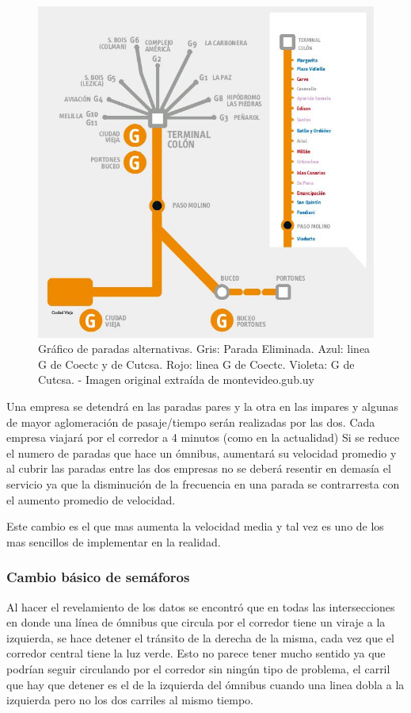 \begin{figure}[H]
	\centering
	\includegraphics[width=0.7\linewidth]{Figures/paradas_alternativas}
	\caption{Gráfico de paradas alternativas. Gris: Parada Eliminada. Azul: linea G de Coectc y de Cutcsa. Rojo: linea G de Coectc. Violeta: G de Cutcsa. - Imagen original extraída de montevideo.gub.uy}
	\label{fig:paradas_alternadas}
\end{figure}

Una empresa se detendrá en las paradas pares y la otra en las impares y algunas de mayor aglomeración de pasaje/tiempo serán realizadas por las dos. Cada empresa viajará por el corredor a 4 minutos (como en la actualidad) Si se reduce el numero de paradas que hace un ómnibus, aumentará su velocidad promedio y al cubrir las paradas entre las dos empresas no se deberá resentir en demasía el servicio ya que la disminución de la frecuencia en una parada se contrarresta con el aumento promedio de velocidad.

Este cambio es el que mas aumenta la velocidad media y tal vez es uno de los mas sencillos de implementar en la realidad.



\subsubsection{Cambio básico de semáforos}
Al hacer el revelamiento de los datos se encontró que en todas las intersecciones en donde una línea de ómnibus que circula por el corredor tiene un viraje a la izquierda, se hace detener el tránsito de la derecha de la misma, cada vez que el corredor central tiene la luz verde. Esto no parece tener mucho sentido ya que podrían seguir circulando por el corredor sin ningún tipo de problema, el carril que hay que detener es el de la izquierda del ómnibus cuando una linea dobla a la izquierda pero no los dos carriles al mismo tiempo.

